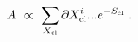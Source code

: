 \begin{equation}
A ~ \propto ~ \sum_{X_{\rm cl}} \partial X^i_{\rm cl}...    e^{-S_{\rm cl}}\;. 
\end{equation}


